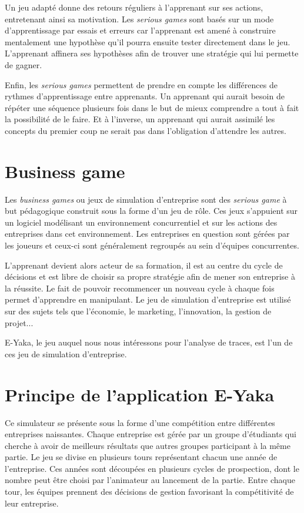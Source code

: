         Un jeu adapté donne des retours réguliers à l’apprenant sur ses actions, entretenant ainsi sa motivation. Les \emph{serious games} sont basés sur un mode d’apprentissage par essais et erreurs car l’apprenant est amené à construire mentalement une hypothèse qu’il pourra ensuite tester directement dans le jeu. L’apprenant affinera ses hypothèses afin de trouver une stratégie qui lui permette de gagner.

        Enfin, les \emph{serious games} permettent de prendre en compte les différences de rythmes d’apprentissage entre apprenants. Un apprenant qui aurait besoin de répéter une séquence plusieurs fois dans le but de mieux comprendre a tout à fait la possibilité de le faire. Et à l’inverse, un apprenant qui aurait assimilé les concepts du premier coup ne serait pas dans l’obligation d’attendre les autres.

    \section{Business game}

        Les \emph{business games} ou jeux de simulation d’entreprise sont des \emph{serious game} à but pédagogique construit sous la forme d’un jeu de rôle. Ces jeux s’appuient sur un logiciel modélisant un environnement concurrentiel et sur les actions des entreprises dans cet environnement. Les entreprises en question sont gérées par les joueurs et ceux-ci sont généralement regroupés au sein d’équipes concurrentes.

        L’apprenant devient alors acteur de sa formation, il est au centre du cycle de décisions et est libre de choisir sa propre stratégie afin de mener son entreprise à la réussite. Le fait de pouvoir recommencer un nouveau cycle à chaque fois permet d’apprendre en manipulant. Le jeu de simulation d’entreprise est utilisé sur des sujets tels que l’économie, le marketing, l’innovation, la gestion de projet...

        E-Yaka, le jeu auquel nous nous intéressons pour l’analyse de traces, est l'un de ces jeu de simulation d’entreprise.


    \section{Principe de l'application E-Yaka}

        Ce simulateur se présente sous la forme d'une compétition entre différentes entreprises naissantes. Chaque entreprise est gérée par un groupe d'étudiants qui cherche à avoir de meilleurs résultats que autres groupes participant à la même partie. Le jeu se divise en plusieurs tours représentant chacun une année de l'entreprise. Ces années sont découpées en plusieurs cycles de prospection, dont le nombre peut être choisi par l'animateur au lancement de la partie. Entre chaque tour, les équipes prennent des décisions de gestion favorisant la compétitivité de leur entreprise.

